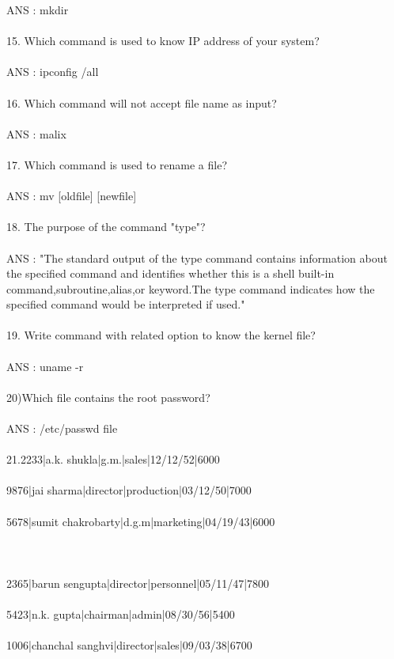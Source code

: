 \documentclass{article}
\begin{document}
ANS : mkdir \\ \\
15. Which command is used to know IP address of your system? \\ \\
ANS : ipconfig /all \\ \\
16. Which command will not accept file name as input? \\ \\
ANS : malix \\ \\
17. Which command is used to rename a file? \\ \\ 
ANS : mv [oldfile] [newfile] \\ \\
18. The purpose of the command "type"? \\ \\
ANS : "The standard output of the type command contains information about the specified command
and identifies whether this is a shell built-in command,subroutine,alias,or keyword.The type
command indicates how the specified command would be interpreted if used." \\ \\
19. Write command with related option to know the kernel file? \\ \\
ANS : uname -r \\ \\
20)Which file contains the root password?\\ \\
ANS : /etc/passwd file \\ \\
21.2233|a.k. shukla|g.m.|sales|12/12/52|6000\\ \\
9876|jai sharma|director|production|03/12/50|7000\\ \\
5678|sumit chakrobarty|d.g.m|marketing|04/19/43|6000\\ \\\\ \\
2365|barun sengupta|director|personnel|05/11/47|7800\\ \\
5423|n.k. gupta|chairman|admin|08/30/56|5400\\ \\
1006|chanchal sanghvi|director|sales|09/03/38|6700\\ \\
\end{document}
